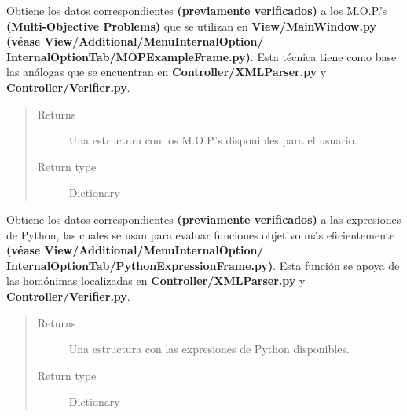 \documentclass[class=report, crop=false]{standalone}
\begin{document}
\begin{fulllineitems}
\begin{fulllineitems}
\end{fulllineitems}

\begin{fulllineitems}

Obtiene los datos correspondientes \textbf{(previamente verificados)}
a los M.O.P.'s \textbf{(Multi-Objective Problems)} que se utilizan en 
\textbf{View/}\break\textbf{MainWindow.py} \textbf{(véase View/Additional/MenuInternalOption/}\break
\textbf{InternalOptionTab/MOPExampleFrame.py)}.\break
Esta técnica tiene como base las análogas que se encuentran en 
\textbf{Controller/XMLParser.py} y \textbf{Controller/Verifier.py}.

\begin{quote}\begin{description}
\item[{Returns}] \leavevmode
Una estructura con los M.O.P.'s disponibles para el usuario.
\item[{Return type}] \leavevmode
Dictionary
\end{description}\end{quote}

\end{fulllineitems}

\begin{fulllineitems}

Obtiene los datos correspondientes \textbf{(previamente verificados)}
a las expresiones de Python, las cuales se usan para evaluar 
funciones objetivo más eficientemente \textbf{(véase View/Additional/MenuInternalOption/}\break
\textbf{InternalOptionTab/PythonExpressionFrame.py)}.\break
Esta función se apoya de las homónimas localizadas en \break
\textbf{Controller/XMLParser.py} y \textbf{Controller/Verifier.py}.

\begin{quote}\begin{description}
\item[{Returns}] \leavevmode
Una estructura con las expresiones de Python disponibles.
\item[{Return type}] \leavevmode
Dictionary
\end{description}\end{quote}

\end{fulllineitems}


\end{fulllineitems}
\end{document}
